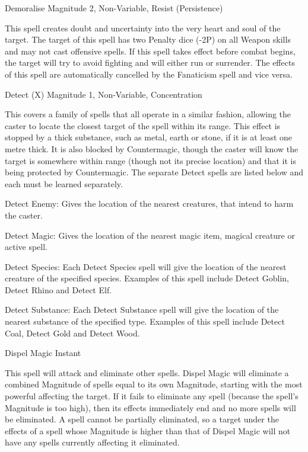 \begin{rpg-spell}
{Demoralise}
{Magnitude 2, Non-Variable, Resist (Persistence)}

  This spell creates doubt and uncertainty into the very heart and soul of the target. The target of this spell has two Penalty dice (-2P) on all Weapon skills and may not cast offensive spells. If this spell takes effect before combat begins, the target will try to avoid fighting and will either run or surrender. The effects of this spell are automatically cancelled by the Fanaticism spell and vice versa. 
\end{rpg-spell}


\begin{rpg-spell}
{Detect (X)}
{Magnitude 1, Non-Variable, Concentration}

This covers a family of spells that all operate in a similar fashion, allowing the caster to locate the closest target of the spell within its range. This effect is stopped by a thick substance, such as metal, earth or stone, if it is at least one metre thick. It is also blocked by Countermagic, though the caster will know the target is somewhere within range (though not its precise location) and that it is being protected by Countermagic. The separate Detect spells are listed below and each must be learned separately.

\begin{rpg-list}
\item Detect Enemy: Gives the location of the nearest creatures, that intend to harm the caster. 
\item Detect Magic: Gives the location of the nearest magic item, magical creature or active spell. 
\item Detect Species: Each Detect Species spell will give the location of the nearest creature of the specified species. Examples of this spell include Detect Goblin, Detect Rhino and Detect Elf. 
\item Detect Substance: Each Detect Substance spell will give the location of the nearest substance of the specified type. Examples of this spell include Detect Coal, Detect Gold and Detect Wood. 
\end{rpg-list}
\end{rpg-spell}


\begin{rpg-spell}
{Dispel Magic}
{Instant}

This spell will attack and eliminate other spells. Dispel Magic will eliminate a combined Magnitude of spells equal to its own Magnitude, starting with the most powerful affecting the target. If it fails to eliminate any spell (because the spell’s Magnitude is too high), then its effects immediately end and no more spells will be eliminated. A spell cannot be partially eliminated, so a target under the effects of a spell whose Magnitude is higher than that of Dispel Magic will not have any spells currently affecting it eliminated. 
\end{rpg-spell}


